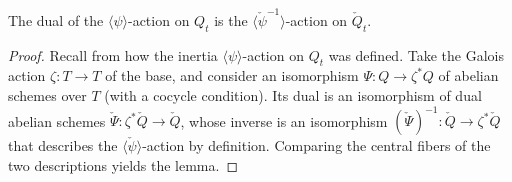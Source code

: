 \documentclass[reqno, letterpaper]{amsart}
\numberwithin{equation}{subsection}
\let\to\longrightarrow
\begin{document}
			\begin{lemma} \label{lem:classification of component group:dual inertia action}
				The dual of the $\langle \psi \rangle$-action on $Q_t$ is the $\langle \check \psi^{-1} \rangle$-action on $\check Q_t$.
			\end{lemma}
			\begin{proof}
				Recall from  how the inertia $\langle \psi \rangle$-action on $Q_t$ was defined. Take the Galois action $\zeta : T \to T$ of the base, and consider an isomorphism $\Psi : Q \to \zeta^* Q$ of abelian schemes over $T$ (with a cocycle condition). Its dual is an isomorphism of dual abelian schemes $\check \Psi : \zeta^* \check Q \to \check Q$, whose inverse is an isomorphism $(\check \Psi)^{-1} : \check Q \to \zeta^* \check Q$ that describes the $\langle \check \psi \rangle$-action by definition. Comparing the central fibers of the two descriptions yields the lemma.
			\end{proof}
			
\end{document}
